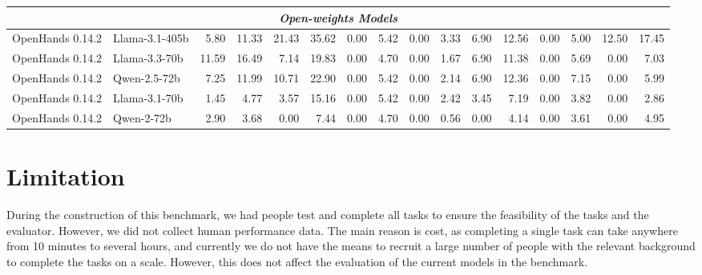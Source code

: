 \begin{table}[t]
{\begin{tabular}{l|l|rrrrrrrrrrrrrr}
\midrule
\multicolumn{16}{c}{\textit{Open-weights Models}} \\
\midrule
OpenHands 0.14.2 & Llama-3.1-405b & 5.80 & 11.33 & 21.43 & 35.62 & 0.00 & 5.42 & 0.00 & 3.33 & 6.90 & 12.56 & 0.00 & 5.00 & 12.50 & 17.45\\
OpenHands 0.14.2 & Llama-3.3-70b & 11.59 & 16.49 & 7.14 & 19.83 & 0.00 & 4.70 & 0.00 & 1.67 & 6.90 & 11.38 & 0.00 & 5.69 & 0.00 & 7.03\\
OpenHands 0.14.2 & Qwen-2.5-72b & 7.25 & 11.99 & 10.71 & 22.90 & 0.00 & 5.42 & 0.00 & 2.14 & 6.90 & 12.36 & 0.00 & 7.15 & 0.00 & 5.99\\
OpenHands 0.14.2 & Llama-3.1-70b & 1.45 & 4.77 & 3.57 & 15.16 & 0.00 & 5.42 & 0.00 & 2.42 & 3.45 & 7.19 & 0.00 & 3.82 & 0.00 & 2.86 \\
OpenHands 0.14.2 & Qwen-2-72b & 2.90 & 3.68 & 0.00 & 7.44 & 0.00 & 4.70 & 0.00 & 0.56 & 0.00 & 4.14 & 0.00 & 3.61 & 0.00 & 4.95\\
\bottomrule
\end{tabular}
}
\end{table}

\section{Limitation}
\label{app:limitation}

During the construction of this benchmark, we had people test and complete all tasks to ensure the feasibility of the tasks and the evaluator. However, we did not collect human performance data. The main reason is cost, as completing a single task can take anywhere from 10 minutes to several hours, and currently we do not have the means to recruit a large number of people with the relevant background to complete the tasks on a scale. However, this does not affect the evaluation of the current models in the benchmark.


